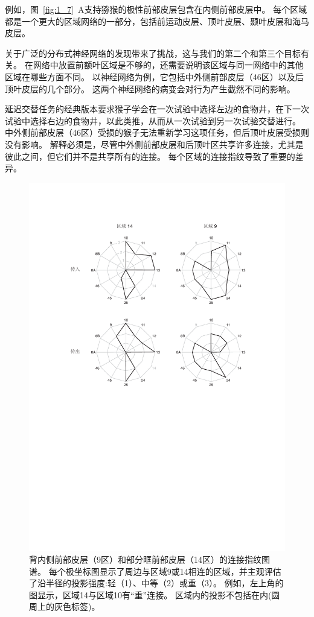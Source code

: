 \par
例如，图~\ref{fig:1_7}~A支持猕猴的极性前部皮层包含在内侧前部皮层中。
每个区域都是一个更大的区域网络的一部分，包括前运动皮层、顶叶皮层、颞叶皮层和海马皮层。


\par
关于广泛的分布式神经网络的发现带来了挑战，这与我们的第二个和第三个目标有关。
在网络中放置前额叶区域是不够的，还需要说明该区域与同一网络中的其他区域在哪些方面不同。
以神经网络为例，它包括中外侧前部皮层（46区）以及后顶叶皮层的几个部分。
这两个神经网络的病变会对行为产生截然不同的影响。


\par
延迟交替任务的经典版本要求猴子学会在一次试验中选择左边的食物井，在下一次试验中选择右边的食物井，以此类推，从而从一次试验到另一次试验交替进行。
中外侧前部皮层（46区）受损的猴子无法重新学习这项任务\cite{butters1969retention}，但后顶叶皮层受损则没有影响\cite{ettlinger1966tactile}。
解释必须是，尽管中外侧前部皮层和后顶叶区共享许多连接，尤其是彼此之间，但它们并不是共享所有的连接。
每个区域的连接指纹导致了重要的差异。


\begin{figure}[!htb]
	\centering
	\includegraphics[width=0.65\linewidth]{chap1/1_6}
	\caption{背内侧前部皮层（9区）和部分眶前部皮层（14区）的连接指纹图谱。
		每个极坐标图显示了周边与区域9或14相连的区域，并主观评估了沿半径的投影强度:轻（1）、中等（2）或重（3）。
		例如，左上角的图显示，区域14与区域10有“重”连接。
		区域内的投影不包括在内(圆周上的灰色标签)\cite{2002Dorsal}。 \label{fig:1_6}}
\end{figure}

